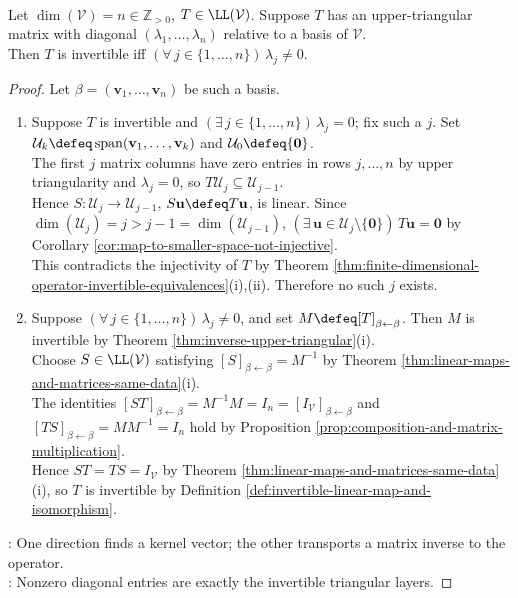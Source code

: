 \begin{proposition} \label{prop:upper-triangular-invertibility-criterion} \\
Let $\dim(\mathcal{V})=n\in\mathbb{Z}_{>0}$, $T\in\LL(\mathcal{V})$. Suppose $T$ has an upper-triangular matrix with diagonal $(\lambda_1,\ldots,\lambda_n)$ relative to a basis of $\mathcal{V}$.\\
Then $T$ is invertible iff $(\forall\,j\in\{1,\ldots,n\})\,\lambda_j\neq0$.
\begin{proof}
Let $\beta=(\mathbf{v}_1,\ldots,\mathbf{v}_n)$ be such a basis.
\begin{enumerate}[label=\roman*.]
\setlength{\itemsep}{0pt}
\item[$(\Rightarrow)$] Suppose $T$ is invertible and $(\exists\,j\in\{1,\ldots,n\})\,\lambda_j=0$; fix such a $j$. Set $\mathcal{U}_k\defeq\operatorname{span}(\mathbf{v}_1,\ldots,\mathbf{v}_k)$ and $\mathcal{U}_0\defeq\{\mathbf{0}\}$.\\
The first $j$ matrix columns have zero entries in rows $j,\ldots,n$ by upper triangularity and $\lambda_j=0$, so $T\mathcal{U}_j\subseteq\mathcal{U}_{j-1}$.\\
Hence $S:\mathcal{U}_j\to\mathcal{U}_{j-1}$, $S\mathbf{u}\defeq T\mathbf{u}$, is linear. Since $\dim(\mathcal{U}_j)=j>j-1=\dim(\mathcal{U}_{j-1})$, $(\exists\,\mathbf{u}\in\mathcal{U}_j\setminus\{\mathbf{0}\})\,T\mathbf{u}=\mathbf{0}$ by Corollary \ref{cor:map-to-smaller-space-not-injective}.\\
This contradicts the injectivity of $T$ by Theorem \ref{thm:finite-dimensional-operator-invertible-equivalences}(i),(ii). Therefore no such $j$ exists.
\item[$(\Leftarrow)$] Suppose $(\forall\,j\in\{1,\ldots,n\})\,\lambda_j\neq0$, and set $M\defeq[T]_{\beta\leftarrow\beta}$. Then $M$ is invertible by Theorem \ref{thm:inverse-upper-triangular}(i).\\
Choose $S\in\LL(\mathcal{V})$ satisfying $[S]_{\beta\leftarrow\beta}=M^{-1}$ by Theorem \ref{thm:linear-maps-and-matrices-same-data}(i).\\
The identities $[ST]_{\beta\leftarrow\beta}=M^{-1}M=I_n=[I_{\mathcal{V}}]_{\beta\leftarrow\beta}$ and $[TS]_{\beta\leftarrow\beta}=MM^{-1}=I_n$ hold by Proposition \ref{prop:composition-and-matrix-multiplication}.\\
Hence $ST=TS=I_{\mathcal{V}}$ by Theorem \ref{thm:linear-maps-and-matrices-same-data}(i), so $T$ is invertible by Definition \ref{def:invertible-linear-map-and-isomorphism}.
\end{enumerate}
: One direction finds a kernel vector; the other transports a matrix inverse to the operator.\\
: Nonzero diagonal entries are exactly the invertible triangular layers.
\end{proof}
\end{proposition}

